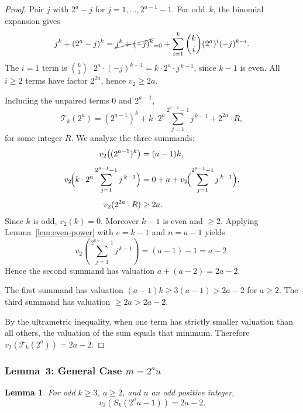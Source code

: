 \documentclass[12pt,a4paper]{article}
\theoremstyle{plain}
\newtheorem{lemma}[theorem]{Lemma}
\theoremstyle{definition}
\newcommand{\vtwo}[1]{v_{2}\!\left(#1\right)}
\newcommand{\Tk}{\mathcal{T}_{k}}
\begin{document}
\begin{proof}
  Pair $j$ with $2^a - j$ for $j = 1, \dots, 2^{a-1}-1$.  For odd~$k$, the
  binomial expansion gives
  \[
    j^k + (2^a - j)^k
    = \cancel{j^k + (-j)^k}_{=0}
      + \sum_{i=1}^{k} \binom{k}{i} (2^a)^i (-j)^{k-i}.
  \]
  The $i=1$ term is $\binom{k}{1} \cdot 2^a \cdot (-j)^{k-1}
  = k \cdot 2^a \cdot j^{\,k-1}$, since $k-1$ is even.  All $i \ge 2$ terms
  have factor $2^{2a}$, hence $v_2 \ge 2a$.

  Including the unpaired terms $0$ and $2^{a-1}$,
  \[
    \Tk(2^a) = (2^{a-1})^k
      + k \cdot 2^a \sum_{j=1}^{2^{a-1}-1} j^{\,k-1}
      + 2^{2a} \cdot R,
  \]
  for some integer $R$.  We analyze the three summands:
  \begin{align*}
    v_2\bigl((2^{a-1})^k\bigr) &= (a-1)k, \\[4pt]
    v_2\!\Bigl(k \cdot 2^a \sum_{j=1}^{2^{a-1}-1} j^{\,k-1}\Bigr)
      &= 0 + a + v_2\!\Bigl(\sum_{j=1}^{2^{a-1}-1} j^{\,k-1}\Bigr), \\[4pt]
    v_2(2^{2a} \cdot R) &\ge 2a.
  \end{align*}
  Since $k$ is odd, $v_2(k) = 0$.  Moreover $k-1$ is even and $\ge 2$.
  Applying Lemma~\ref{lem:even-power} with $e = k-1$ and $n = a-1$ yields
  \[
    \vtwo{\sum_{j=1}^{2^{a-1}-1} j^{\,k-1}} = (a-1) - 1 = a - 2.
  \]
  Hence the second summand has valuation $a + (a-2) = 2a - 2$.

  The first summand has valuation $(a-1)k \ge 3(a-1) > 2a-2$ for $a \ge 2$.
  The third summand has valuation $\ge 2a > 2a-2$.

  By the ultrametric inequality, when one term has strictly smaller valuation
  than all others, the valuation of the sum equals that minimum.  Therefore
  $v_2(\Tk(2^a)) = 2a - 2$.
\end{proof}

\subsubsection{Lemma~3: General Case $m = 2^a u$}
\label{sec:lemma3}

\begin{lemma}\label{lem:main-val}
  For odd $k \ge 3$, $a \ge 2$, and $u$ an odd positive integer,
  \begin{equation}\label{eq:main-val}
    \vtwo{S_k(2^a u - 1)} = 2a - 2.
  \end{equation}
\end{lemma}
\end{document}
